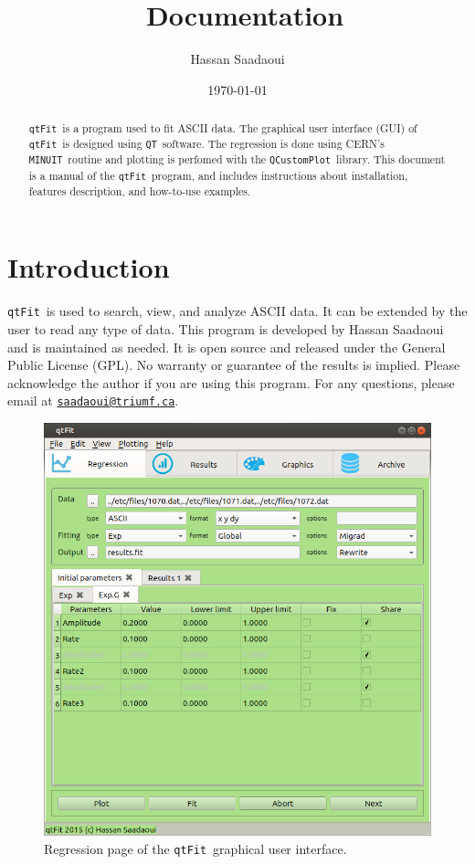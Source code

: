 \documentclass[10pt,letterpaper,oneside]{article}
\title{\name\ Documentation}
\author{Hassan Saadaoui \\
\small{\myemail}}
\date{\today}
\makeatletter
\newcommand{\qt}{\texttt{QT}}
\newcommand{\minuit}{\texttt{MINUIT}}
\newcommand{\name}{\texttt{qtFit}}
\newcommand{\qcp}{\texttt{QCustomPlot}}
\newcommand{\myemail}{\texttt{\href{mailto:saadaoui@triumf.ca}{saadaoui@triumf.ca}}}
\makeatother
\begin{document}
\maketitle

\begin{abstract}
 \noindent \normalsize
 \name\ is a program used to fit 	ASCII data.
 The  graphical user interface (GUI) of \name\ is designed using \qt\ software. 
 The regression is done using CERN's \minuit\ routine and plotting
 is perfomed with the \qcp\ library. 
 This document is a manual of the \name\ program, and includes 
 instructions about installation, features description, 
 and how-to-use examples.

\end{abstract}
\tableofcontents
\pagebreak



\section{Introduction}
\name\ is used to search, view, and analyze ASCII data. It can be extended by the user to read any type of data. This program is developed by Hassan Saadaoui and is maintained as needed. It is open source and released under the General Public License (GPL). No warranty or guarantee of the results is implied. Please acknowledge the author if you are using this program. For any questions, please email at \myemail.
\begin{figure}[!htb]
\includegraphics[width=\textwidth]{regression.png}
 \caption{Regression page of the \name\ graphical user interface.}
 \label{fig-dep}
 \end{figure}
\pagebreak
\end{document}
